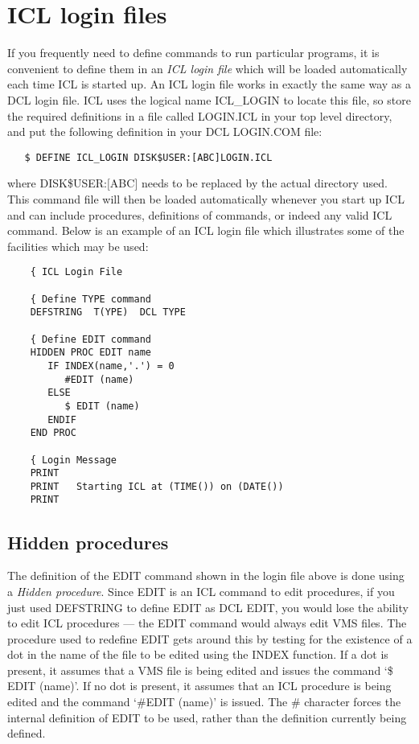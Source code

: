 \section{ICL login files}
\label{S_icllf}

If you frequently need to define commands to run particular programs, it is
convenient to define them in an {\em ICL login file} which will be loaded
automatically each time ICL is started up.
An ICL login file works in exactly the same way as a DCL login file.
ICL uses the logical name ICL\_LOGIN to locate this file, so store the
required definitions in a file called LOGIN.ICL in your top level directory,
and put the following definition in your DCL LOGIN.COM file:

\begin{small}
\begin{verbatim}
   $ DEFINE ICL_LOGIN DISK$USER:[ABC]LOGIN.ICL
\end{verbatim}
\end{small}

where DISK\$USER:$[$ABC$]$ needs to be replaced by the actual directory used.
This command file will then be loaded automatically whenever you start up ICL
and can include procedures, definitions of commands, or indeed any valid ICL
command.
Below is an example of an ICL login file which illustrates some of the
facilities which may be used:

\begin{small}
\begin{verbatim}
    { ICL Login File

    { Define TYPE command
    DEFSTRING  T(YPE)  DCL TYPE

    { Define EDIT command
    HIDDEN PROC EDIT name
       IF INDEX(name,'.') = 0
          #EDIT (name)
       ELSE
          $ EDIT (name)
       ENDIF
    END PROC

    { Login Message
    PRINT
    PRINT   Starting ICL at (TIME()) on (DATE())
    PRINT
\end{verbatim}
\end{small}


\subsection{Hidden procedures}

The definition of the EDIT command shown in the login file above is done using
a {\em Hidden procedure}.
Since EDIT is an ICL command to edit procedures, if you just used DEFSTRING to
define EDIT as DCL EDIT, you would lose the ability to edit ICL procedures ---
the EDIT command would always edit VMS files.
The procedure used to redefine EDIT gets around this by testing for the
existence of a dot in the name of the file to be edited using the INDEX
function.
If a dot is present, it assumes that a VMS file is being edited and issues the
command `\$ EDIT (name)'.
If no dot is present, it assumes that an ICL procedure is being edited and
the command `\#EDIT (name)' is issued.
The \# character forces the internal definition of EDIT to be used, rather than
the definition currently being defined.

